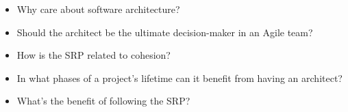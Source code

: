 \begin{itemize}
\item Why care about software architecture?
\item Should the architect be the ultimate decision-maker in an Agile team?
\item How is the SRP related to cohesion?
\item In what phases of a project's lifetime can it benefit from having an architect?
\item What's the benefit of following the SRP?
\end{itemize}